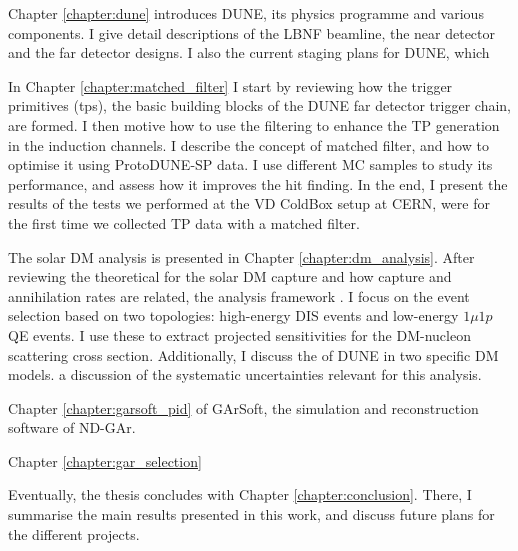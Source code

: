 Chapter \ref{chapter:dune} introduces DUNE, its physics programme and various components. I give detail descriptions of the LBNF beamline, the near detector and the far detector designs. I also the current staging plans for DUNE, which 

In Chapter \ref{chapter:matched_filter} I start by reviewing how the trigger primitives (\gls{tp}s), the basic building blocks of the DUNE far detector trigger chain, are formed. I then motive how to use the filtering to enhance the TP generation in the induction channels. I describe the concept of matched filter, and how to optimise it using ProtoDUNE-SP data. I use different MC samples to study its performance, and assess how it improves the hit finding. In the end, I present the results of the tests we performed at the VD ColdBox setup at CERN, were for the first time we collected TP data with a matched filter.

The solar DM analysis is presented in Chapter \ref{chapter:dm_analysis}. After reviewing the theoretical for the solar DM capture and how capture and annihilation rates are related, the analysis framework . I focus on the event selection based on two topologies: high-energy DIS events and low-energy $1\mu1p$ QE events. I use these to extract projected sensitivities for the DM-nucleon scattering cross section. Additionally, I discuss the of DUNE in two specific DM models. a discussion of the systematic uncertainties relevant for this analysis.

Chapter \ref{chapter:garsoft_pid} of GArSoft, the simulation and reconstruction software of ND-GAr. 

Chapter \ref{chapter:gar_selection}

Eventually, the thesis concludes with Chapter \ref{chapter:conclusion}. There, I summarise the main results presented in this work, and discuss future plans for the different projects.